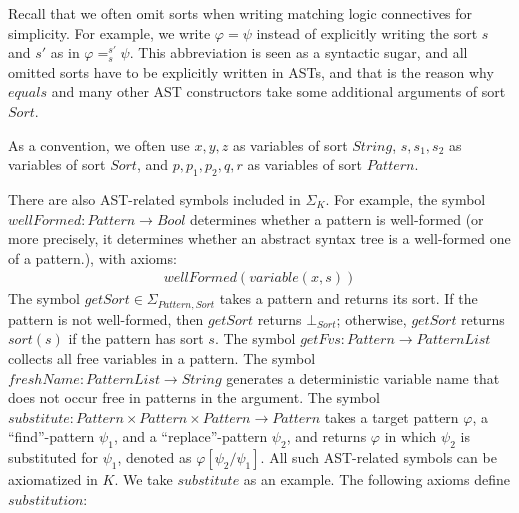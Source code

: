 \documentclass[UTF8]{article}
\theoremstyle{plain}
\theoremstyle{definition}
\theoremstyle{remark}
\begin{document}
Recall that we often omit sorts when writing matching logic connectives for simplicity.
For example, we write $\varphi = \psi$ instead of explicitly writing the sort $s$ and $s'$ as in $\varphi =_{s}^{s'} \psi$.
This abbreviation is seen as a syntactic sugar, and all omitted sorts have to be explicitly written in ASTs, and that is the reason why $\mathit{equals}$ and many other AST constructors take some additional arguments of sort $\mathit{Sort}$.

As a convention, we often use $x, y, z$ as variables of sort $\mathit{String}$, $s, s_1, s_2$ as variables of sort $\mathit{Sort}$, and $p, p_1, p_2, q, r$ as variables of sort $\mathit{Pattern}$. 

There are also AST-related symbols included in $\Sigma_K$.
For example, the symbol $\mathit{wellFormed} \colon \mathit{Pattern} \to \mathit{Bool}$ determines whether a pattern is well-formed (or more precisely, it determines whether an abstract syntax tree is a well-formed one of a pattern.), with axioms:
\begin{align*}
\mathit{wellFormed}(\mathit{variable}(x, s))
\end{align*}
The symbol $\mathit{getSort} \in \Sigma_{\mathit{Pattern}, \mathit{Sort}}$ takes a pattern and returns its sort. 
If the pattern is not well-formed, then $\mathit{getSort}$ returns $\bot_\mathit{Sort}$; 
otherwise, $\mathit{getSort}$ returns $\mathit{sort}(s)$ if the pattern has sort $s$.
The symbol $\mathit{getFvs} \colon \mathit{Pattern} \to \mathit{PatternList}$ collects all free variables in a pattern.
The symbol $\mathit{freshName} \colon \mathit{PatternList} \to \mathit{String}$ generates a deterministic variable name that does not occur free in patterns in the argument.
The symbol $\mathit{substitute} \colon \mathit{Pattern} \times \mathit{Pattern} \times \mathit{Pattern} \to \mathit{Pattern}$ takes a target pattern $\varphi$, a ``find''-pattern $\psi_1$, and a ``replace''-pattern $\psi_2$, and returns $\varphi$ in which $\psi_2$ is substituted for $\psi_1$, denoted as $\varphi[\psi_2 / \psi_1]$.
All such AST-related symbols can be axiomatized in $K$. 
We take $\mathit{substitute}$ as an example. 
The following axioms define $\mathit{substitution}$:
\end{document}
